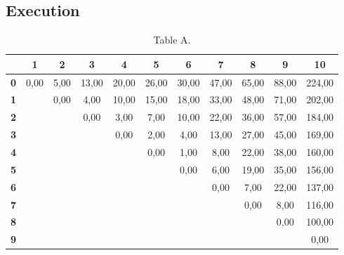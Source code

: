 \documentclass{article}
\begin{document}
\newpage
\newpage
\tableofcontents
\newpage

\subsection{Execution}
\begin{table}[!ht]
\begin{adjustwidth}{-3cm}{-3cm}
\centering
\begin{tabular}{c||c|c|c|c|c|c|c|c|c|c|}
\cline{2-11}
 & \cellcolor{gray90}\textbf{1} & \cellcolor{gray90}\textbf{2} & \cellcolor{gray90}\textbf{3} & \cellcolor{gray90}\textbf{4} & \cellcolor{gray90}\textbf{5} & \cellcolor{gray90}\textbf{6} & \cellcolor{gray90}\textbf{7} & \cellcolor{gray90}\textbf{8} & \cellcolor{gray90}\textbf{9} & \cellcolor{gray90}\textbf{10} \\
\hline\hline
\multicolumn{1}{|c||}{\cellcolor{gray90}\textbf{0}} & 0,00 & 5,00 & 13,00 & 20,00 & 26,00 & 30,00 & 47,00 & 65,00 & 88,00 & 224,00 \\ \hline
\multicolumn{1}{|c||}{\cellcolor{gray90}\textbf{1}} &  & 0,00 & 4,00 & 10,00 & 15,00 & 18,00 & 33,00 & 48,00 & 71,00 & 202,00 \\ \hline
\multicolumn{1}{|c||}{\cellcolor{gray90}\textbf{2}} &  &  & 0,00 & 3,00 & 7,00 & 10,00 & 22,00 & 36,00 & 57,00 & 184,00 \\ \hline
\multicolumn{1}{|c||}{\cellcolor{gray90}\textbf{3}} &  &  &  & 0,00 & 2,00 & 4,00 & 13,00 & 27,00 & 45,00 & 169,00 \\ \hline
\multicolumn{1}{|c||}{\cellcolor{gray90}\textbf{4}} &  &  &  &  & 0,00 & 1,00 & 8,00 & 22,00 & 38,00 & 160,00 \\ \hline
\multicolumn{1}{|c||}{\cellcolor{gray90}\textbf{5}} &  &  &  &  &  & 0,00 & 6,00 & 19,00 & 35,00 & 156,00 \\ \hline
\multicolumn{1}{|c||}{\cellcolor{gray90}\textbf{6}} &  &  &  &  &  &  & 0,00 & 7,00 & 22,00 & 137,00 \\ \hline
\multicolumn{1}{|c||}{\cellcolor{gray90}\textbf{7}} &  &  &  &  &  &  &  & 0,00 & 8,00 & 116,00 \\ \hline
\multicolumn{1}{|c||}{\cellcolor{gray90}\textbf{8}} &  &  &  &  &  &  &  &  & 0,00 & 100,00 \\ \hline
\multicolumn{1}{|c||}{\cellcolor{gray90}\textbf{9}} &  &  &  &  &  &  &  &  &  & 0,00 \\ \hline
\end{tabular}
\caption{Table A.}
\end{adjustwidth}
\end{table}
\end{document}
